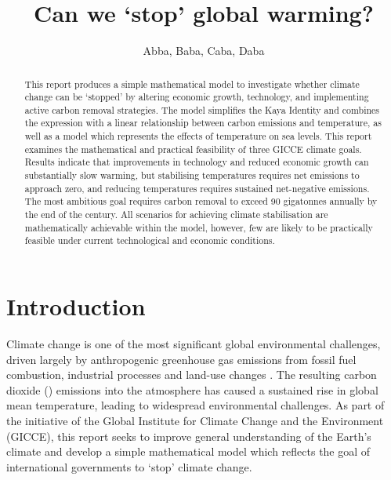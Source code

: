 \documentclass[12pt]{article}
\title{\vspace{-1cm} Can we `stop' global warming?}
\author{Abba, Baba, Caba, Daba}		%
\newcommand{\cotwo}{\text{CO\textsubscript{2}}}
\begin{document}
\maketitle

\begin{abstract}
	This report produces a simple mathematical model to investigate whether climate change can be `stopped'
	by altering economic growth, technology, and implementing active carbon removal strategies.
	The model simplifies the Kaya Identity and combines the expression with a linear relationship between carbon emissions and temperature,
	as well as a model which represents the effects of temperature on sea levels.
	This report examines the mathematical and practical feasibility of three GICCE climate goals.
	Results indicate that improvements in technology and reduced economic growth can substantially slow warming,
	but stabilising temperatures requires net emissions to approach zero, and reducing temperatures requires
	sustained net-negative emissions.
	The most ambitious goal requires carbon removal to exceed 90 gigatonnes annually by the end of the century.
	All scenarios for achieving climate stabilisation are mathematically achievable within the model,
	however, few are likely to be practically feasible under current technological and economic conditions.
\end{abstract}

\vfill
\setcounter{tocdepth}{2}
\tableofcontents
\clearpage

\section{Introduction}

Climate change is one of the most significant global environmental challenges,
driven largely by anthropogenic greenhouse gas emissions from fossil fuel combustion,
industrial processes and land-use changes \cite{ipcc_2023}.
The resulting carbon dioxide (\cotwo{}) emissions into the atmosphere has caused a sustained rise in global mean temperature,
leading to widespread environmental challenges.
As part of the initiative of the Global Institute for Climate Change and the Environment (GICCE),
this report seeks to improve general understanding of the Earth’s climate and develop a simple mathematical model
which reflects the goal of international governments to `stop' climate change.
\end{document}
